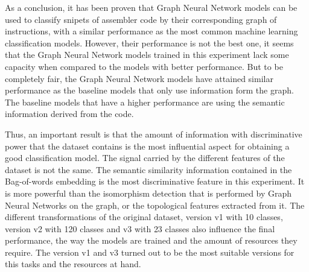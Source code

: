 As a conclusion, it has been proven that Graph Neural Network models can be used to classify snipets of assembler code by their corresponding graph of instructions, with a similar performance as the most common machine learning classification models.  However, their performance is not the best one, it seems that the Graph Neural Network models trained in this experiment lack some capacity when compared to the models with better performance. But to be completely fair, the Graph Neural Network models have attained similar performance as the baseline models that only use information form the graph. The baseline models that have a higher performance are using the semantic information derived from the code.

Thus, an important result is that the amount of information with discriminative power that the dataset contains is the most influential aspect for obtaining a good classification model.
The signal carried by the different features of the dataset is not the same. The semantic similarity information contained in the Bag-of-words embedding is the most discriminative feature in this experiment. It is more powerful than the isomorphism detection that is performed by Graph Neural Networks on the graph, or the topological features extracted from it.
The different transformations of the original dataset, version v1 with 10 classes, version v2 with 120 classes and v3 with 23 classes also influence the final performance, the way the models are trained and the amount of resources they require. The version v1 and v3 turned out to be the most suitable versions for this tasks and the resources at hand. 





